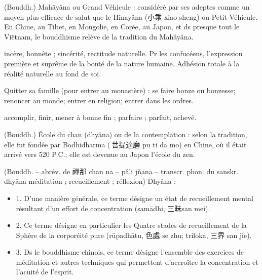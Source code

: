 \begin{Def}[dasheng 大乘]
    (Bouddh.) Mahâyâna ou Grand Véhicule : considéré par ses adeptes comme un moyen plus efficace de salut que le Hînayâna (小乘 xiao sheng) ou Petit Véhicule. En Chine, au Tibet, en Mongolie, en Corée, au Japon, et ds presque tout le Viêtnam, le bouddhisme relève de la tradition du Mahâyâna.
\end{Def}
\begin{Def}[cheng 誠]
    incère, honnête ; sincérité, rectitude naturelle. Pr les confucéens, l’expression première et suprême de la bonté de la nature humaine. Adhésion totale à la réalité naturelle au fond de soi. 
\end{Def}
\begin{Def}[chujia 出家]
     Quitter sa famille (pour entrer au monastère) : se faire bonze ou bonzesse; renoncer au monde; entrer en religion; entrer dans les ordres. 
\end{Def}
\begin{Def}[cheng 成]
    accomplir, finir, mener à bonne fin ; parfaire ; parfait, achevé.
\end{Def}
\begin{Def}[chanzong 禪宗]
    (Bouddh.) École du chan (dhyâna) ou de la contemplation : selon la tradition, elle fut fondée par Bodhidharma ( 菩提達磨 pu ti da mo) en Chine, où il était arrivé vers 520 P.C.; elle est devenue au Japon l’école du zen.
\end{Def}
\begin{Def}[chan 禪]
    (Bouddh. – abrév. de 禪那 chan na – pâli jñāna – transcr. phon. du sanskr. dhyāna méditation ; recueillement ; réflexion) Dhyâna :	\begin{itemize}
        \item 1. D’une manière générale, ce terme désigne un état de recueillement mental résultant d’un effort de concentration (samādhi, 三昧san mei).  
        \item 2. Ce terme désigne en particulier les Quatre stades de recueillement de la Sphère de la corporéité pure (rūpadhātu, 色處 se zhu; triloka, 三界 san jie).  
        \item 3. Ds le bouddhisme chinois, ce terme désigne l’ensemble des exercices de méditation et autres techniques qui permettent d’accroître la concentration et l’acuité de l’esprit. 
    \end{itemize}
    
\end{Def}

